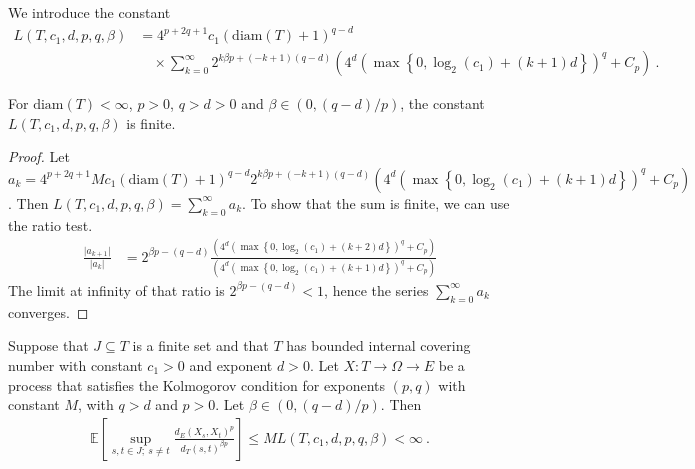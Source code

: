 \begin{definition}\label{def:L}
  \leanok
We introduce the constant
\begin{align*}
  L(T, c_1, d, p, q, \beta)
  &= 4^{p+2q+1} c_1 (\mathrm{diam}(T)+1)^{q-d}
  \\&\quad \times \sum_{k=0}^\infty 2^{k \beta p + (-k + 1)(q-d)}\left(4^d \left(\max\left\{0, \log_2(c_1) + (k + 1)d \right\}\right)^q
    + C_p\right)
  \: .
\end{align*}
\end{definition}


\begin{lemma}\label{lem:L_lt_top}
  \leanok
For $\mathrm{diam}(T) < \infty$, $p> 0$, $q > d > 0$ and $\beta \in (0, (q-d)/p)$, the constant $L(T, c_1, d, p, q, \beta)$ is finite.
\end{lemma}

\begin{proof}
Let $a_k = 4^{p+2q+1} M c_1 (\mathrm{diam}(T)+1)^{q-d} 2^{k \beta p + (-k + 1)(q-d)} \left(4^d \left(\max\left\{0, \log_2(c_1) + (k + 1)d \right\}\right)^q
    + C_p\right)$.
Then $L(T, c_1, d, p, q, \beta) = \sum_{k=0}^\infty a_k$.
To show that the sum is finite, we can use the ratio test.
\begin{align*}
  \frac{\vert a_{k+1} \vert}{\vert a_k \vert}
  &= 2^{\beta p - (q - d)}
    \frac{\left(4^d \left(\max\left\{0, \log_2(c_1) + (k + 2)d \right\}\right)^q + C_p\right)}
    {\left(4^d \left(\max\left\{0, \log_2(c_1) + (k + 1)d \right\}\right)^q + C_p\right)}
\end{align*}
The limit at infinity of that ratio is $2^{\beta p - (q - d)} < 1$, hence the series $\sum_{k=0}^\infty a_k$ converges.
\end{proof}


\begin{lemma}\label{lem:finite_set_bound}
  \leanok
Suppose that $J \subseteq T$ is a finite set and that $T$ has bounded internal covering number with constant $c_1>0$ and exponent $d > 0$.
Let $X : T \to \Omega \to E$ be a process that satisfies the Kolmogorov condition for exponents $(p,q)$ with constant $M$, with $q > d$ and $p > 0$.
Let $\beta \in(0, (q - d)/p)$.
Then
\begin{align*}
  \mathbb{E}\left[ \sup_{s, t \in J;\: s \ne t} \frac{d_E(X_s, X_t)^p}{d_T(s, t)^{\beta p}} \right]
  \le M L(T, c_1, d, p, q, \beta)
  < \infty
  \: .
\end{align*}
\end{lemma}

